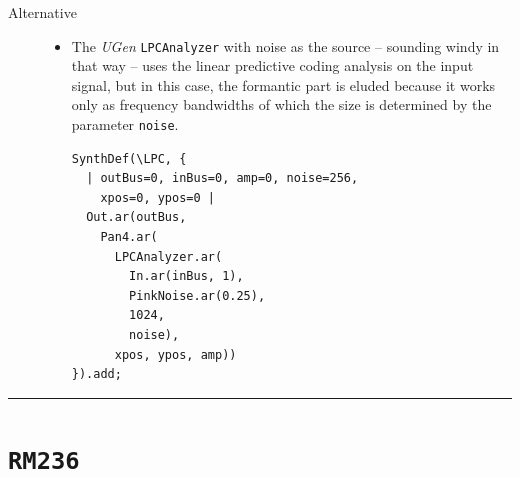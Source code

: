 \begin{description}
\bigskip
\newpage
\setcounter{footnote}{0}
\item[Alternative] \hfill 
\begin{itemize}
\item[] The \textsl{UGen} \texttt{LPCAnalyzer} with noise as the source -- sounding windy in that way -- uses the linear predictive coding analysis
\citep{mak} %
on the input signal, but in this case, the formantic part is eluded because it works only as frequency bandwidths of which the size is determined by the parameter \texttt{noise}. 

\smallskip

\begin{lstlisting}
SynthDef(\LPC, {
  | outBus=0, inBus=0, amp=0, noise=256, 
    xpos=0, ypos=0 |
  Out.ar(outBus, 
    Pan4.ar(
      LPCAnalyzer.ar(
        In.ar(inBus, 1), 
        PinkNoise.ar(0.25), 
        1024, 
        noise), 
      xpos, ypos, amp))
}).add;
\end{lstlisting}
\end{itemize}
\end{description}

\bigskip

\begin{center}\rule{0.5\linewidth}{0.5pt}\end{center}

\bigskip

\section*{\texttt{RM236}}


\bigskip

